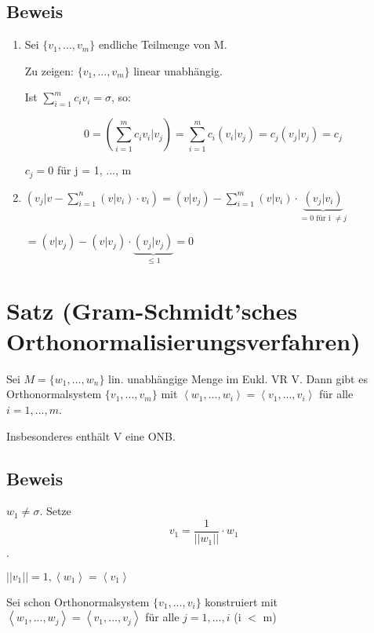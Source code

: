 \documentclass[a4paper, openany]{book}
\begin{document}
        \subsection{Beweis}

        \begin{enumerate}[label=(\alph*)]
          \item Sei $\{v_1, ..., v_m\}$ endliche Teilmenge von M.

          Zu zeigen: $\{v_1, ..., v_m \}$ linear unabhängig. 

          Ist $\sum_{i=1}^m c_i v_i = \sigma$, so:

          \[ 0 = (\sum_{i=1}^m c_i v_i | v_j) = \sum_{i=1}^m c_i (v_i | v_j) = c_j (v_j | v_j) = c_j \]

          $c_j = 0$ für j = 1, ..., m 


          \item $(v_j | v - \sum_{i=1}^n (v | v_i) \cdot v_i) = (v | v_j) - \sum_{i=1}^m (v | v_i) \cdot \underbrace{(v_j | v_i)}_{= 0 \text{ für i $\neq j$}}$

          $ = (v | v_j) - (v | v_j) \cdot \underbrace{(v_j | v_j)}_{\le 1} = 0$
        \end{enumerate}

        \section{Satz (Gram-Schmidt'sches Orthonormalisierungsverfahren)}

        Sei $M = \{w_1, ..., w_n \}$ lin. unabhängige Menge im Eukl. VR V. Dann gibt es Orthonormalsystem $\{v_1, ..., v_m \}$ mit $\left \langle w_1, ..., w_i \right \rangle = \left \langle v_1, ..., v_i \right \rangle$ für alle $i=1,...,m$.

        Insbesonderes enthält V eine ONB.

        \subsection{Beweis}

        $w_1 \neq \sigma$. Setze \[v_1 = \frac{1}{||w_1||} \cdot w_1\].

        $||v_1|| = 1, \left \langle w_1 \right \rangle = \left \langle v_1 \right \rangle$

        \par \medskip

        Sei schon Orthonormalsystem $\{v_1, ..., v_i \}$ konstruiert mit $\left \langle w_1, ..., w_j \right \rangle = \left \langle v_1, ..., v_j \right \rangle$ für alle $j = 1, ..., i$ (i $<$ m)
\end{document}
